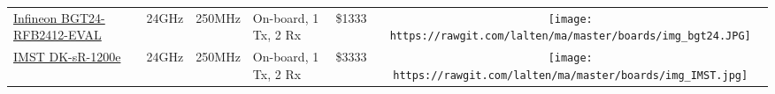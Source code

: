 \begin{longtable}[]{@{}llllllc@{}}
\begin{minipage}[t]{0.09\columnwidth}\raggedright\strut
	\href{https://www.infineon.com/dgdl/Infineon-AN380_BGT24-RFB2412_user_manual-AN-v01_00-EN.pdf?fileId=5546d46259d9a4bf0159f9f1fa503f1d}{Infineon BGT24-RFB2412-EVAL}
\strut\end{minipage} &
\begin{minipage}[t]{0.13\columnwidth}\raggedright\strut

\strut\end{minipage} &
\begin{minipage}[t]{0.09\columnwidth}\raggedright\strut
24GHz
\strut\end{minipage} &
\begin{minipage}[t]{0.11\columnwidth}\raggedright\strut
250MHz
\strut\end{minipage} &
\begin{minipage}[t]{0.10\columnwidth}\raggedright\strut
On-board, 1 Tx, 2 Rx
\strut\end{minipage} &
\begin{minipage}[t]{0.15\columnwidth}\raggedright\strut
\$1333
\strut\end{minipage} &
\begin{minipage}[t]{0.10\columnwidth}\centering\strut
\texttt{[image: https://rawgit.com/lalten/ma/master/boards/img\_bgt24.JPG]}
\strut\end{minipage}\tabularnewline

\begin{minipage}[t]{0.09\columnwidth}\raggedright\strut
	\href{http://webshop.imst.de/dk-sr-1200e-development-platform-for-24-ghz-fmcw-radar-application.html
}{IMST DK-sR-1200e}
\strut\end{minipage} &
\begin{minipage}[t]{0.13\columnwidth}\raggedright\strut

\strut\end{minipage} &
\begin{minipage}[t]{0.09\columnwidth}\raggedright\strut
24GHz
\strut\end{minipage} &
\begin{minipage}[t]{0.11\columnwidth}\raggedright\strut
250MHz
\strut\end{minipage} &
\begin{minipage}[t]{0.10\columnwidth}\raggedright\strut
On-board, 1 Tx, 2 Rx
\strut\end{minipage} &
\begin{minipage}[t]{0.15\columnwidth}\raggedright\strut
\$3333
\strut\end{minipage} &
\begin{minipage}[t]{0.10\columnwidth}\centering\strut
\texttt{[image: https://rawgit.com/lalten/ma/master/boards/img\_IMST.jpg]}
\strut\end{minipage}\tabularnewline


\end{longtable}
